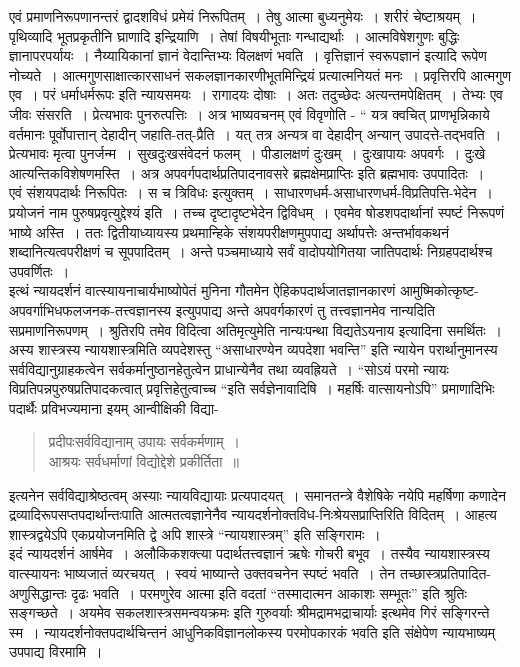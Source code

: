 {एवं प्रमाणनिरूपणानन्तरं द्वादशविधं प्रमेयं निरूपितम्~। तेषु आत्मा बुध्यनुमेयः~। शरीरं चेष्टाश्रयम्~। पृथिव्यादि भूतप्रकृतीनि घ्राणादि इन्द्रियाणि~। तेषां विषयीभूताः गन्धाद्यर्थाः~। आत्मविषेशगुणः बुद्धिः ज्ञानापरपर्यायः~। नैय्यायिकानां ज्ञानं वेदान्तिभ्यः विलक्षणं भवति~। वृत्तिज्ञानं स्वरूपज्ञानं इत्यादि रूपेण नोच्यते~। आत्मगुणसाक्षात्कारसाधनं सकलज्ञानकारणीभूतमिन्द्रियं प्रत्यात्मनियतं मनः~। प्रवृत्तिरपि आत्मगुण एव~। परं धर्माधर्मरूपः इति न्यायसमयः~। रागादयः दोषाः~। अतः तदुच्छेदः अत्यन्तमपेक्षितम्~। तेभ्यः एव जीवः संसरति~। प्रेत्यभावः पुनरुत्पत्तिः~। अत्र भाष्यवचनम् एवं विवृणोति - “ यत्र क्वचित् प्राणभृन्निकाये वर्तमानः पूर्वोपात्तान् देहादीन् जहाति-तत्-प्रैति~। यत् तत्र अन्यत्र वा देहादीन् अन्यान् उपादत्ते-तद्भवति~। प्रेत्यभावः मृत्वा पुनर्जन्म~। सुखदुःखसंवेदनं फलम्~। पीडालक्षणं दुःखम्~। दुःखापायः अपवर्गः~। दुःखे आत्यन्तिकविशेषणमस्ति~। अत्र अपवर्गपदार्थप्रतिपादनावसरे ब्रह्मक्षेमप्राप्तिः इति ब्रह्मभावः उपपादितः~। 
~\\[0.2cm]
एवं संशयपदार्थः निरूपितः~। स च त्रिविधः इत्युक्तम्~। साधारणधर्म-असाधारणधर्म-विप्रतिपत्ति-भेदेन~। प्रयोजनं नाम पुरुषप्रवृत्युद्देश्यं इति~। तच्च दृष्टादृष्टभेदेन द्विविधम्~। एवमेव षोडशपदार्थानां स्पष्टं निरूपणं भाष्ये अस्ति~। ततः द्वितीयाध्यायस्य प्रथमान्हिके संशयपरीक्षणमुपपाद्य अर्थापत्तेः अन्तर्भावकथनं शब्दानित्यत्वपरीक्षणं च सूपपादितम्~। अन्ते पञ्चमाध्याये सर्वं वादोपयोगितया जातिपदार्थः निग्रहपदार्थश्च उपवर्णितः~। 
~\\[0.2cm]
इत्थं न्यायदर्शनं वात्स्यायनाचार्यभाष्योपेतं मुनिना गौतमेन ऐहिकपदार्थजातज्ञान\-कारणं आमुष्मिकोत्कृष्ट-अपवर्गाभिधफलजनक-तत्त्वज्ञानस्य इत्युपपाद्य अन्ते अपवर्गकारणं तु \break तत्त्वज्ञानमेव नान्यदिति सप्रमाणनिरूपणम्~। श्रुतिरपि तमेव विदित्वा अतिमृत्युमेति नान्यः\-पन्था विद्यतेऽयनाय इत्यादिना समर्थितः~।  अस्य शास्त्रस्य न्यायशास्त्रमिति व्यपदेशस्तु \-“असाधारण्येन व्यपदेशा भवन्ति” इति न्यायेन परार्थानुमानस्य सर्वविद्यानुग्राहकत्वेन \break सर्वकर्मानुष्ठानहेतुत्वेन प्राधान्येनैव तथा व्यवह्रियते~। “सोऽयं परमो न्यायः विप्रतिपन्न\-पुरुषप्रतिपादकत्वात् प्रवृत्तिहेतुत्वाच्च “इति सर्वज्ञेनावादिषि~। महर्षिः वात्सायनोऽपि” प्रमाणादिभिः पदार्थैः प्रविभज्यमाना इयम् आन्वीक्षिकी विद्या-

\begin{verse}
प्रदीपःसर्वविद्यानाम् उपायः सर्वकर्मणाम्~। \\
आश्रयः सर्वधर्माणां विद्योद्देशे प्रकीर्तिता~॥
\end{verse}

इत्यनेन सर्वविद्याश्रेष्ठत्वम् अस्याः न्यायविद्यायाः प्रत्यपादयत्~। समानतन्त्रे वैशेषिके \-नयेपि महर्षिणा कणादेन द्रव्यादिरूपसप्तपदार्थान्तःपाति आत्मतत्वज्ञानेनैव न्यायदर्शनोक्त\-विध-निःश्रेयसप्राप्तिरिति विदितम्~। आहत्य शास्त्रद्वयेऽपि एकप्रयोजनमिति द्वे अपि शास्त्रे “न्यायशास्त्रम्” इति सङ्गिरामः~। 
~\\[0.2cm]
इदं न्यायदर्शनं आर्षमेव~। अलौकिकशक्त्या पदार्थतत्त्वज्ञानं ऋषेः गोचरी बभूव~। तस्यैव न्यायशास्त्रस्य वात्स्यायनः भाष्यजातं व्यरचयत्~। स्वयं भाष्यान्ते उक्तवचनेन स्पष्टं भवति~। तेन तच्छास्त्रप्रतिपादित-अणुसिद्धान्तः दृढः भवति~।  परमणुरेव आत्मा इति वदतां “तस्मादात्मन आकाशः सम्भूतः” इति श्रुतिः सङ्गच्छते~।  अयमेव सकलशास्त्रसमन्वयक्रमः इति गुरुवर्याः श्रीमद्रामभद्राचार्याः इत्थमेव गिरं सङ्गिरन्ते स्म~। न्यायदर्शनोक्तपदार्थचिन्तनं आधुनिकविज्ञानलोकस्य परमोपकारकं भवति इति संक्षेपेण न्यायभाष्यम् उपपाद्य विरमामि~। 

\articleend
}

